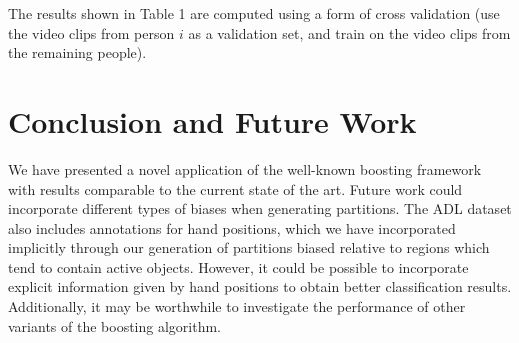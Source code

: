 \documentclass[10pt,twocolumn,letterpaper]{article}
\begin{document}
	The results shown in Table 1 are computed using a form of cross
	validation (use the video clips from person $i$ as a validation set, and
	train on the video clips from the remaining people).
	
\section{Conclusion and Future Work}
	We have presented a novel application of the well-known boosting framework
	with results comparable to the current state of the art. 
	Future work could incorporate different types of biases when generating
	partitions. The ADL dataset also includes annotations for hand positions,
	which we have incorporated implicitly through our generation of partitions
	biased relative to regions which tend to contain active objects. However,
	it could be possible to incorporate explicit information given by hand
	positions to obtain better classification results.
	Additionally, it may be worthwhile to investigate the performance of other
	variants of the boosting algorithm.

{\small


}
\end{document}
